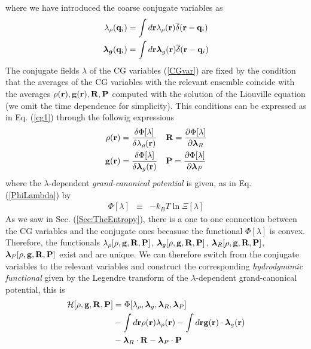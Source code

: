\documentclass[b5paper,openright,11pt]{book}
\begin{document}
where we have introduced the coarse conjugate variables as
  \begin{align}
\lambda_\rho({\bf q}_i)&=
\int d{\bf r}\lambda_{\rho}({\bf r})\overline{\delta}({\bf r}-{\bf q}_i)
\nonumber\\
\boldsymbol{\lambda_g}({\bf q}_i)&=
\int d{\bf r}\boldsymbol{\lambda}_g({\bf r})\overline{\delta}({\bf r}-{\bf q}_i)
  \end{align}
The conjugate fields $\lambda$ of the CG variables (\ref{CGvar}) are fixed by the condition that the averages of the CG variables with the relevant ensemble coincide with the averages $\rho({\bf  r}),{\bf  g}({\bf
  r}),{\bf  R},{\bf  P}$  computed  with  the 
  solution of  the Liouville equation (we omit the time  dependence for simplicity). This conditions can be expressed as in Eq. (\ref{cg1}) through the followig expressions 
\begin{align}
  \rho({\bf r}) &=\frac{\delta \Phi [\lambda]}{\delta \lambda_\rho({\bf r}) }
&&{\bf R} =\frac{\partial \Phi [\lambda]}{\partial \boldsymbol{\lambda}_R }
\nonumber\\
  {\bf g}({\bf r}) &=\frac{\delta \Phi [\lambda]}{\delta \boldsymbol{\lambda}_g({\bf r}) }
&&{\bf P} =\frac{\partial \Phi [\lambda]}{\partial \boldsymbol{\lambda}_P }
\label{rgo}
\end{align}
where the $\lambda$-dependent {\em grand-canonical potential} is given, as in Eq. (\ref{PhiLambda}) by
\begin{eqnarray}
  \Phi [\lambda]&\equiv&-k_BT \ln\Xi [\lambda]
\label{oh}
\end{eqnarray}
As we saw in Sec. (\ref{Sec:TheEntropy}), there is a one to one connection between the CG variables and the conjugate ones becasuse the functional $\Phi[\lambda]$ is convex.  
Therefore, the  functionals $\lambda_{\rho}[\rho,{\bf  g},{\bf R},{\bf
  P}]$,   $\boldsymbol{\lambda}_g[\rho,{\bf   g},{\bf  R},{\bf   P}]$,
$\boldsymbol{\lambda}_R[\rho,{\bf      g},{\bf      R},{\bf      P}]$,
$\boldsymbol{\lambda}_P[\rho,{\bf g},{\bf  R},{\bf P}]$ exist  and are
unique.   We  can  therefore   switch  from  the  conjugate  variables
 to  the   relevant   variables  and  construct   the
 corresponding {\em hydrodynamic functional} given   by   the   Legendre    transform   of   the $\lambda$-dependent grand-canonical potential, this is
\begin{align}
{\cal H}[\rho,{\bf g},{\bf R},{\bf P}] &=
\Phi [\lambda_\rho,\boldsymbol{\lambda}_g,\boldsymbol{\lambda}_R,\boldsymbol{\lambda}_P]
\nonumber\\
& -
\int d{\bf r}\rho({\bf r})\lambda_\rho({\bf r})
-
\int d{\bf r}{\bf g}({\bf r})\cdot\boldsymbol{\lambda}_g({\bf r})
\nonumber\\
&
-\boldsymbol{\lambda}_R\cdot{\bf R}-\boldsymbol{\lambda}_P\cdot{\bf P}
\label{oleg}
\end{align}
\end{document}
